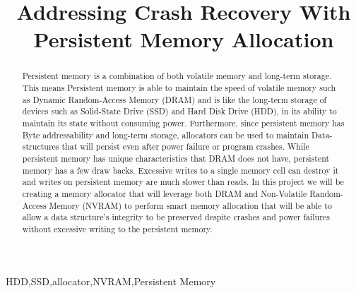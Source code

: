 \documentclass[conference]{IEEEtran}
\begin{document}
\title{Addressing Crash Recovery With Persistent Memory Allocation\\
{\footnotesize \textsuperscript{}}
}

\author{

}
\maketitle

\begin{abstract}
Persistent memory is a combination of both volatile memory and long-term storage.  This means Persistent memory is able to maintain the speed of volatile memory such as Dynamic Random-Access Memory (DRAM) and is like the long-term storage of devices such as Solid-State Drive (SSD) and Hard Disk Drive (HDD), in its ability to maintain its state without consuming power. Furthermore, since persistent memory has Byte addressability and long-term storage, allocators can be used to maintain Data-structures that will persist even after power failure or program crashes. While persistent memory has unique characteristics that DRAM does not have, persistent memory has a few draw backs. Excessive writes to a single memory cell can destroy it and writes on persistent memory are much slower than reads. In this project we will be creating a memory allocator that will leverage both DRAM and Non-Volatile Random-Access Memory (NVRAM) to perform smart memory allocation that will be able to allow a data structure’s integrity to be preserved despite crashes and power failures without excessive writing to the persistent memory.
\end{abstract}

\begin{IEEEkeywords}
HDD,SSD,allocator,NVRAM,Persistent Memory
\end{IEEEkeywords}
\end{document}
